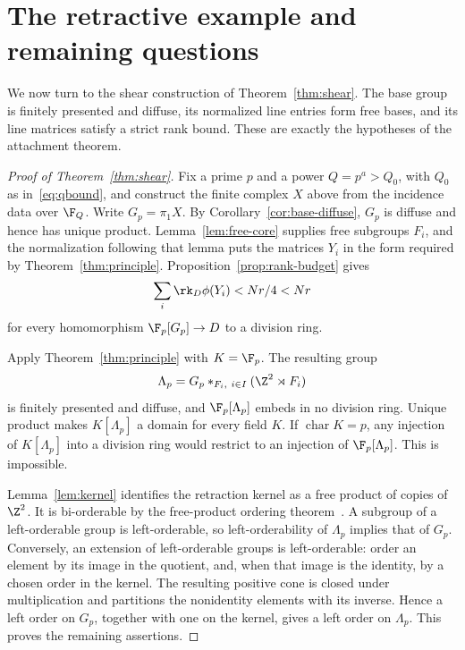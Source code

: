 \section{The retractive example and remaining questions}\label{sec:finish}

We now turn to the shear construction of Theorem~\ref{thm:shear}. The base group is finitely
presented and diffuse, its normalized line entries form free bases,
and its line matrices satisfy a strict rank bound. These are exactly
the hypotheses of the attachment theorem.

\begin{proof}[Proof of Theorem~\ref{thm:shear}]
Fix a prime \(p\) and a power \(Q=p^a>Q_0\), with \(Q_0\) as
in~\eqref{eq:qbound}, and construct the finite complex \(X\) above
from the incidence data over \(\F_Q\). Write \(G_p=\pi_1X\).
By Corollary~\ref{cor:base-diffuse}, \(G_p\) is diffuse and hence has
unique product. Lemma~\ref{lem:free-core} supplies free subgroups
\(F_i\), and the normalization following that lemma puts the
matrices \(Y_i\) in the form required by Theorem~\ref{thm:principle}.
Proposition~\ref{prop:rank-budget} gives
\[
 \sum_i\rk_D\phi(Y_i)<Nr/4<Nr
\]
for every homomorphism \(\F_p[G_p]\to D\) to a division ring.

Apply Theorem~\ref{thm:principle} with \(K=\F_p\). The resulting
group
\[
 \Lambda_p=G_p*_{F_i,\ i\in I}(\Z^2\rtimes F_i)
\]
is finitely presented and diffuse, and \(\F_p[\Lambda_p]\) embeds in
no division ring. Unique product makes \(K[\Lambda_p]\) a domain for
every field \(K\). If \(\operatorname{char}K=p\), any injection of
\(K[\Lambda_p]\) into a division ring would restrict to an injection
of \(\F_p[\Lambda_p]\). This is impossible.

Lemma~\ref{lem:kernel} identifies the retraction kernel as a free
product of copies of \(\Z^2\). It is bi-orderable by the free-product
ordering theorem~\cite{Vinogradov}. A subgroup of a left-orderable
group is left-orderable, so left-orderability of \(\Lambda_p\) implies
that of \(G_p\). Conversely, an extension of left-orderable groups is
left-orderable: order an element by its image in the quotient, and,
when that image is the identity, by a chosen order in the kernel.
The resulting positive cone is closed under multiplication and
partitions the nonidentity elements with its inverse. Hence a left
order on \(G_p\), together with one on the kernel, gives a left order
on \(\Lambda_p\). This proves the remaining assertions.
\end{proof}

